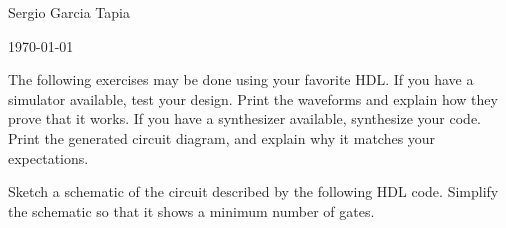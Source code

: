 \documentclass[12pt]{article}
\newenvironment{ex}[2][Exercise]{\begin{trivlist}
		\item[\hskip \labelsep {\bfseries #1}\hskip \labelsep {\bfseries #2.}]}{\end{trivlist}}
\begin{document}

\noindent Sergio Garcia Tapia \hfill

 \hfill

 \hfill 

\noindent\today

The following exercises may be done using your favorite HDL. If you have a
simulator available, test your design. Print the waveforms and explain
how they prove that it works. If you have a synthesizer available, synthesize
your code. Print the generated circuit diagram, and explain why it matches
your expectations.

\begin{ex}{4.1}
	Sketch a schematic of the circuit described by the following HDL code.
	Simplify the schematic so that it shows a minimum number of gates.
	
\end{ex}
\end{document}
